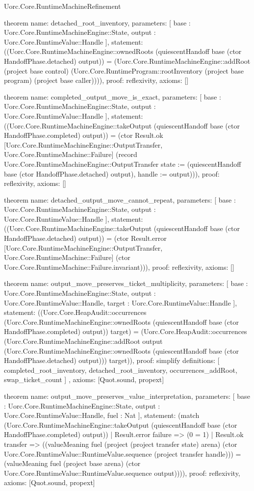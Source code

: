 \begin{lexlean}{Uorc.Core.RuntimeMachineRefinement}
\begin{semanticmodule}
theorem{
  name: detached_root_inventory,
  parameters: [
    base : Uorc.Core.RuntimeMachineEngine::State,
    output : Uorc.Core.RuntimeValue::Handle
  ],
  statement: ((Uorc.Core.RuntimeMachineEngine::ownedRoots (quiescentHandoff base (ctor HandoffPhase.detached) output)) = (Uorc.Core.RuntimeMachineEngine::addRoot (project base control) (Uorc.Core.RuntimeProgram::rootInventory (project base program) (project base caller)))),
  proof: reflexivity{},
  axioms: []
}

theorem{
  name: completed_output_move_is_exact,
  parameters: [
    base : Uorc.Core.RuntimeMachineEngine::State,
    output : Uorc.Core.RuntimeValue::Handle
  ],
  statement: ((Uorc.Core.RuntimeMachineEngine::takeOutput (quiescentHandoff base (ctor HandoffPhase.completed) output)) = (ctor Result.ok [Uorc.Core.RuntimeMachineEngine::OutputTransfer, Uorc.Core.RuntimeMachine::Failure] (record Uorc.Core.RuntimeMachineEngine::OutputTransfer {state := (quiescentHandoff base (ctor HandoffPhase.detached) output), handle := output}))),
  proof: reflexivity{},
  axioms: []
}

theorem{
  name: detached_output_move_cannot_repeat,
  parameters: [
    base : Uorc.Core.RuntimeMachineEngine::State,
    output : Uorc.Core.RuntimeValue::Handle
  ],
  statement: ((Uorc.Core.RuntimeMachineEngine::takeOutput (quiescentHandoff base (ctor HandoffPhase.detached) output)) = (ctor Result.error [Uorc.Core.RuntimeMachineEngine::OutputTransfer, Uorc.Core.RuntimeMachine::Failure] (ctor Uorc.Core.RuntimeMachine::Failure.invariant))),
  proof: reflexivity{},
  axioms: []
}

theorem{
  name: output_move_preserves_ticket_multiplicity,
  parameters: [
    base : Uorc.Core.RuntimeMachineEngine::State,
    output : Uorc.Core.RuntimeValue::Handle,
    target : Uorc.Core.RuntimeValue::Handle
  ],
  statement: ((Uorc.Core.HeapAudit::occurrences (Uorc.Core.RuntimeMachineEngine::ownedRoots (quiescentHandoff base (ctor HandoffPhase.completed) output)) target) = (Uorc.Core.HeapAudit::occurrences (Uorc.Core.RuntimeMachineEngine::addRoot output (Uorc.Core.RuntimeMachineEngine::ownedRoots (quiescentHandoff base (ctor HandoffPhase.detached) output))) target)),
  proof: simplify{
    definitions: [
      completed_root_inventory,
      detached_root_inventory,
      occurrences_addRoot,
      swap_ticket_count
    ]
  },
  axioms: [Quot.sound, propext]
}

theorem{
  name: output_move_preserves_value_interpretation,
  parameters: [
    base : Uorc.Core.RuntimeMachineEngine::State,
    output : Uorc.Core.RuntimeValue::Handle,
    fuel : Nat
  ],
  statement: (match (Uorc.Core.RuntimeMachineEngine::takeOutput (quiescentHandoff base (ctor HandoffPhase.completed) output))
    | Result.error failure => (0 = 1)
    | Result.ok transfer => ((valueMeaning fuel (project (project transfer state) arena) (ctor Uorc.Core.RuntimeValue::RuntimeValue.sequence (project transfer handle))) = (valueMeaning fuel (project base arena) (ctor Uorc.Core.RuntimeValue::RuntimeValue.sequence output)))),
  proof: reflexivity{},
  axioms: [Quot.sound, propext]
}


\end{semanticmodule}
\end{lexlean}
